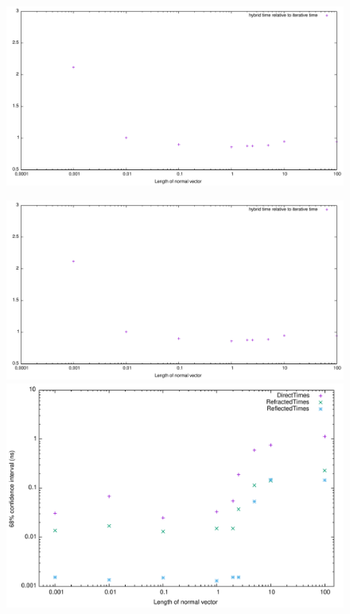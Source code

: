 \documentclass{beamer}
\begin{document}
\begin{frame}
	\begin{figure}
		\includegraphics[width=\textwidth]{figures/NormVsTime.pdf}
	\end{figure}
\end{frame}
\begin{frame}
	\begin{figure}
		\begin{minipage}{\textwidth}
			\centering
			\includegraphics[height=0.45\textheight]{figures/NormVsTime.pdf}
		\end{minipage}
		\begin{minipage}{\textwidth}
			\centering
			\includegraphics[height=0.45\textheight]{figures/NormVsSigmaTime.pdf}
		\end{minipage}
	\end{figure}
\end{frame}
\end{document}
